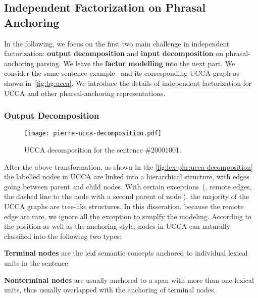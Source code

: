 \subsection{Independent Factorization on Phrasal Anchoring}
\label{ssec:lex-phr:phr-factorization-analysis}
In the following, we focus on the first two main challenge in
independent factorization: \textbf{output decomposition} and
\textbf{input decomposition} on phrasal-anchoring parsing. We leave the
\textbf{factor modelling} into the next part. We consider the same
sentence example~ and its corresponding UCCA graph as
shown in~\autoref{fig:bg:ucca}. We introduce the details of
independent factorization for UCCA and other pharsal-anchoring
representations.

\subsubsection{Output Decomposition}
\label{sssec:lex-phr:phr-output-decomposition}
\begin{figure}[!tbp]
  \begin{center}
  \texttt{[image: pierre-ucca-decomposition.pdf]}
  \end{center}
  \caption{\label{fig:lex-phr:ucca-decomposition} UCCA decomposition
    for the sentence \#20001001.}
\end{figure}
After the above transformation, as shown in the
\autoref{fig:lex-phr:ucca-decomposition} the labelled nodes in UCCA
are linked into a hierarchical structure, with edges going between
parent and child nodes. With certain exceptions~(\eg, remote edges,
the dashed line to the node  with a second parent of node
), the majority of the UCCA graphs are tree-like
structures. In this disseration, because the remote edge are rare, we
ignore all the exception to simplfy the modeling. According to the
position as well as the anchoring style, nodes in UCCA can naturally
classified into the following two types:

\begin{inparaenum}
\item \textbf{Terminal nodes} are the leaf semantic
  concepts anchored to individual lexical units in the sentence

\item \textbf{Nonterminal nodes} are usually anchored to a span with
  more than one lexical units, thus usually overlapped with the
  anchoring of terminal nodes.
\end{inparaenum}

